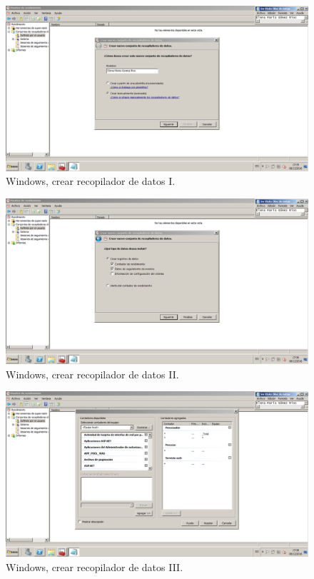 \begin{figure}[H] 
	\centering
	\includegraphics[width=14.7cm]{./img/ejercicio5_1.png} 	
	\caption{Windows, crear recopilador de datos I.} \label{fig:ejercicio5_1}
\end{figure}

\begin{figure}[H] 
	\centering
	\includegraphics[width=14.7cm]{./img/ejercicio5_2.png} 	
	\caption{Windows, crear recopilador de datos II.} \label{fig:ejercicio5_2}
\end{figure}

\begin{figure}[H] 
	\centering
	\includegraphics[width=14.7cm]{./img/ejercicio5_3.png} 	
	\caption{Windows, crear recopilador de datos III.} \label{fig:ejercicio5_3}
\end{figure}

